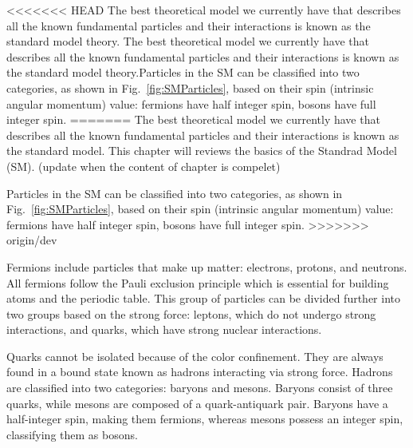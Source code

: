 
<<<<<<< HEAD
The best theoretical model we currently have that describes all the known fundamental particles and their interactions is known as the standard model theory. 
The best theoretical model we currently have that describes all the known fundamental particles and their interactions is known as the standard model theory.Particles in the SM can be classified into two categories, as shown in Fig.~\ref{fig:SMParticles}, based on their spin (intrinsic angular momentum) value: fermions have half integer spin, bosons have full integer spin.
=======
The best theoretical model we currently have that describes all the known fundamental particles and their interactions is known as the standard model.
This chapter will reviews the basics of the Standrad Model (SM). (update when the content of chapter is compelet)


Particles in the SM can be classified into two categories, as shown in Fig.~\ref{fig:SMParticles}, based on their spin (intrinsic angular momentum) value: fermions have half integer spin, bosons have full integer spin.
>>>>>>> origin/dev

Fermions include particles that make up matter: electrons, protons, and neutrons. All fermions follow the Pauli exclusion principle which is essential for building atoms and the periodic table. This group of particles can be divided further into two groups based on the strong force: leptons, which do not undergo strong interactions, and quarks, which have strong nuclear interactions.

Quarks cannot be isolated because of the color confinement. They are always found in a bound state known as hadrons interacting via strong force.
Hadrons are classified into two categories: baryons and mesons.
Baryons consist of three quarks, while mesons are composed of a quark-antiquark pair.
Baryons have a half-integer spin, making them fermions, whereas mesons possess an integer spin, classifying them as bosons.

